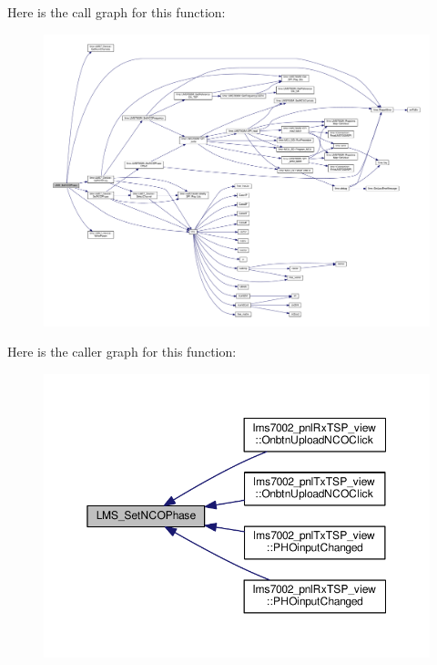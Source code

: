 Here is the call graph for this function\+:
\nopagebreak
\begin{figure}[H]
\begin{center}
\leavevmode
\includegraphics[width=350pt]{df/de1/lms7__api_8cpp_a77d3890ed90bd26431505ca6ea5a4e95_cgraph}
\end{center}
\end{figure}




Here is the caller graph for this function\+:
\nopagebreak
\begin{figure}[H]
\begin{center}
\leavevmode
\includegraphics[width=350pt]{df/de1/lms7__api_8cpp_a77d3890ed90bd26431505ca6ea5a4e95_icgraph}
\end{center}
\end{figure}


